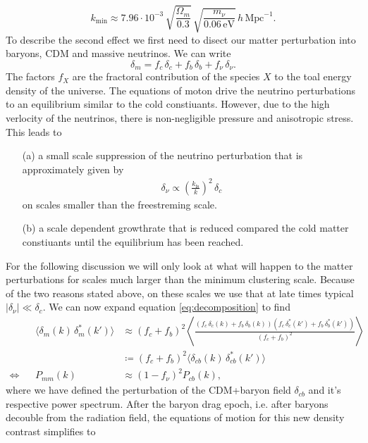 \documentclass[oneside]{book}
\begin{document}
\begin{equation}
    k_\mathrm{min} \approx 7.96\cdot10^{-3}\,\sqrt{\frac{\Omega_m}{0.3}}\,\sqrt{\frac{m_\nu}{0.06\,\mathrm{eV}}}\,h\,\mathrm{Mpc}^{-1}.
\end{equation}
To describe the second effect we first need to disect our matter perturbation into baryons, CDM and massive neutrinos. We can write 
\begin{equation}
    \label{eq:decomposition}
    \delta_m = f_c \,\delta_c + f_b\, \delta_b + f_\nu\,\delta_\nu.
\end{equation}
The factors $f_X$ are the fractoral contribution of the species $X$ to the toal energy density of the universe. The equations of moton drive the neutrino perturbations to an equilibrium similar to the cold constiuants. However, due to the high verlocity of the neutrinos, there is non-negligible pressure and anisotropic stress. 
This leads to \begin{itemize}
    \item[(a)] a small scale suppression of the neutrino perturbation that is approximately given by 
    \begin{align*}
        \delta_\nu \propto \left(\frac{k_\mathrm{fs}}{k}\right)^2\,\delta_c
    \end{align*} 
    on scales smaller than the freestreming scale.
    \item[(b)] a scale dependent growthrate that is reduced compared the cold matter constiuants until the equilibrium has been reached.
\end{itemize}
For the following discussion we will only look at what will happen to the matter perturbations for scales much larger than the minimum clustering scale. Because of the two reasons stated above, on these scales we use that at late times typical $|\delta_\nu|\ll\delta_c$. We can now expand equation \ref{eq:decomposition} to find \begin{align}
 &&\langle \delta_m(k)\,\delta^*_m(k')\rangle &\approx (f_c+f_b)^2\left\langle\frac{(f_c \,\delta_c(k) + f_b\, \delta_b(k))(f_c \,\delta_c^*(k') + f_b\, \delta_b^*(k'))}{(f_c + f_b)^2}\right\rangle \nonumber\\
&&&\coloneqq (f_c+f_b)^2 \langle \delta_{cb}(k)\,\delta_{cb}^*(k') \rangle \\
\Longleftrightarrow && P_{mm}(k) &\approx (1-f_\nu)^2 P_{cb}(k),
\end{align}
where we have defined the perturbation of the CDM+baryon field $\delta_{cb}$ and it's respective power spectrum. After the baryon drag epoch, i.e. after baryons decouble from the radiation field, the equations of motion for this new density contrast simplifies to 
\end{document}
